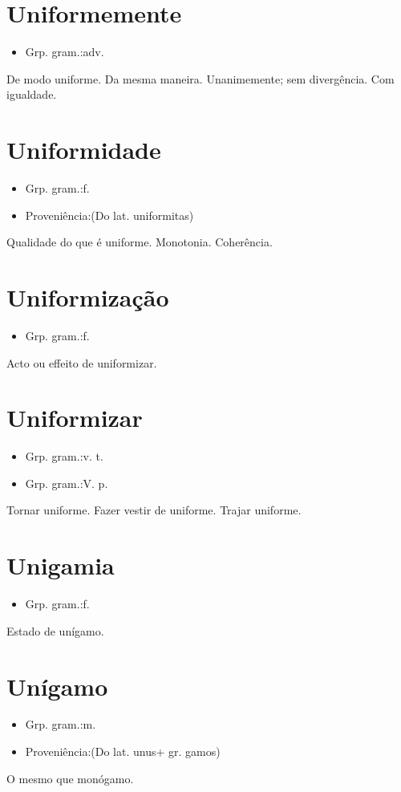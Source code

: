 \documentclass{article}
\begin{document}
\section{Uniformemente}
\begin{itemize}
\item {Grp. gram.:adv.}
\end{itemize}
De modo uniforme.
Da mesma maneira.
Unanimemente; sem divergência.
Com igualdade.
\section{Uniformidade}
\begin{itemize}
\item {Grp. gram.:f.}
\end{itemize}
\begin{itemize}
\item {Proveniência:(Do lat. \textunderscore uniformitas\textunderscore )}
\end{itemize}
Qualidade do que é uniforme.
Monotonia.
Coherência.
\section{Uniformização}
\begin{itemize}
\item {Grp. gram.:f.}
\end{itemize}
Acto ou effeito de uniformizar.
\section{Uniformizar}
\begin{itemize}
\item {Grp. gram.:v. t.}
\end{itemize}
\begin{itemize}
\item {Grp. gram.:V. p.}
\end{itemize}
Tornar uniforme.
Fazer vestir de uniforme.
Trajar uniforme.
\section{Unigamia}
\begin{itemize}
\item {Grp. gram.:f.}
\end{itemize}
Estado de unígamo.
\section{Unígamo}
\begin{itemize}
\item {Grp. gram.:m.}
\end{itemize}
\begin{itemize}
\item {Proveniência:(Do lat. \textunderscore unus\textunderscore  + gr. \textunderscore gamos\textunderscore )}
\end{itemize}
O mesmo que \textunderscore monógamo\textunderscore .
\end{document}
